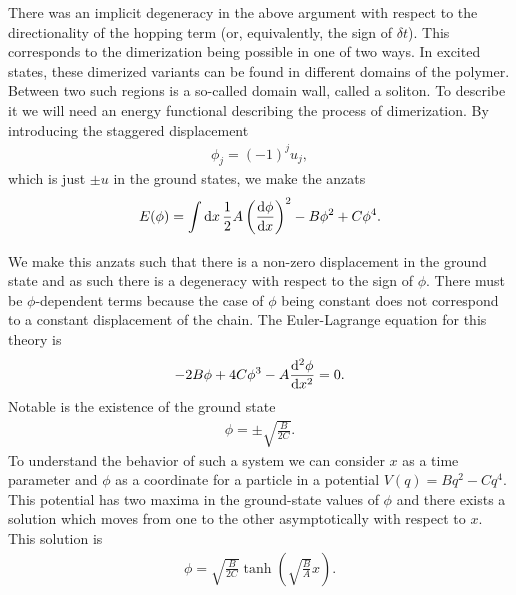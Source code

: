 There was an implicit degeneracy in the above argument with respect to the directionality of the hopping term (or, equivalently, the sign of $\delta t$). This corresponds to the dimerization being possible in one of two ways. In excited states, these dimerized variants can be found in different domains of the polymer. Between two such regions is a so-called domain wall, called a soliton. To describe it we will need an energy functional describing the process of dimerization. By introducing the staggered displacement
\begin{align*}
	\phi_{j} = (-1)^{j}u_{j},
\end{align*}
which is just $\pm u$ in the ground states, we make the anzats
\begin{align*}
	E(\phi) = \int\limits_{}^{}\dd{x}\frac{1}{2}A\left(\dv{\phi}{x}\right)^{2} - B\phi^{2} + C\phi^{4}.
\end{align*}
We make this anzats such that there is a non-zero displacement in the ground state and as such there is a degeneracy with respect to the sign of $\phi$. There must be $\phi$-dependent terms because the case of $\phi$ being constant does not correspond to a constant displacement of the chain. The Euler-Lagrange equation for this theory is
\begin{align*}
	-2B\phi + 4C\phi^{3} - A\dv[2]{\phi}{x} = 0.
\end{align*}
Notable is the existence of the ground state
\begin{align*}
	\phi = \pm\sqrt{\frac{B}{2C}}.
\end{align*}
To understand the behavior of such a system we can consider $x$ as a time parameter and $\phi$ as a coordinate for a particle in a potential $V(q) = Bq^{2} - Cq^{4}$. This potential has two maxima in the ground-state values of $\phi$ and there exists a solution which moves from one to the other asymptotically with respect to $x$. This solution is
\begin{align*}
	\phi = \sqrt{\frac{B}{2C}}\tanh(\sqrt{\frac{B}{A}}x).
\end{align*}


